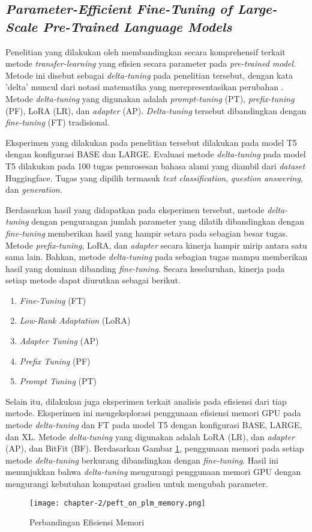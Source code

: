 \subsection{\textit{Parameter-Efficient Fine-Tuning of Large-Scale
Pre-Trained Language Models}}

Penelitian yang dilakukan oleh \citeauthor{peft_on_plm} membandingkan secara komprehensif terkait metode \textit{transfer-learning} yang efisien secara parameter pada \textit{pre-trained model}. Metode ini disebut sebagai \textit{delta-tuning} pada penelitian tersebut, dengan kata 'delta' muncul dari notasi matematika yang merepresentasikan perubahan \parencite{peft_on_plm}. Metode \textit{delta-tuning} yang digunakan adalah \textit{prompt-tuning} (PT), \textit{prefix-tuning} (PF), LoRA (LR), dan \textit{adapter} (AP). \textit{Delta-tuning} tersebut  dibandingkan dengan \textit{fine-tuning} (FT) tradisional.

Eksperimen yang dilakukan pada penelitian tersebut dilakukan pada model T5 dengan konfigurasi BASE dan LARGE. Evaluasi metode \textit{delta-tuning} pada model T5 dilakukan pada 100 tugas pemrosesan bahasa alami yang diambil dari \textit{dataset} Huggingface. Tugas yang dipilih termasuk \textit{text classification}, \textit{question answering}, dan \textit{generation}.

Berdasarkan hasil yang didapatkan pada eksperimen tersebut, metode \textit{delta-tuning} dengan pengurangan jumlah parameter yang dilatih dibandingkan dengan \textit{fine-tuning} memberikan hasil yang hampir setara pada sebagian besar tugas. Metode \textit{prefix-tuning}, LoRA, dan \textit{adapter} secara kinerja hampir mirip antara satu sama lain. Bahkan, metode \textit{delta-tuning} pada sebagian tugas mampu memberikan hasil yang dominan dibanding \textit{fine-tuning}. Secara keseluruhan, kinerja pada setiap metode dapat diurutkan sebagai berikut.

\begin{enumerate}
    \item \textit{Fine-Tuning} (FT)
    \item \textit{Low-Rank Adaptation} (LoRA)
    \item \textit{Adapter Tuning} (AP)
    \item \textit{Prefix Tuning} (PF)
    \item \textit{Prompt Tuning} (PT)
\end{enumerate}

Selain itu, dilakukan juga eksperimen terkait analisis pada efisiensi dari tiap metode. Eksperimen ini mengeksplorasi penggunaan efisiensi memori GPU pada metode \textit{delta-tuning} dan FT pada model T5 dengan konfigurasi BASE, LARGE, dan XL. Metode \textit{delta-tuning} yang digunakan adalah LoRA (LR), dan \textit{adapter} (AP), dan BitFit (BF). Berdasarkan Gambar \ref{fig:peft_on_plm_memory}, penggunaan memori pada setiap metode \textit{delta-tuning} berkurang dibandingkan dengan \textit{fine-tuning}. Hasil ini menunjukkan bahwa \textit{delta-tuning} mengurangi penggunaan memori GPU dengan mengurangi kebutuhan komputasi gradien untuk mengubah parameter.

\begin{figure}[ht]
    \centering
    \texttt{[image: chapter-2/peft\_on\_plm\_memory.png]}
    \caption{Perbandingan Efisiensi Memori \parencite{peft_on_plm}}
    \label{fig:peft_on_plm_memory}
\end{figure}
